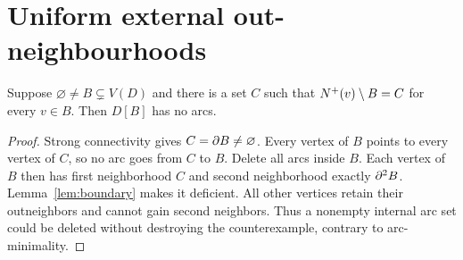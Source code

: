 \section{Uniform external out-neighbourhoods}
\begin{lemma}\label{lem:uniform}
Suppose $\varnothing\ne B\subsetneq V(D)$ and there is a set $C$ such
that $N^+(v)\setminus B=C$ for every $v\in B$.
Then $D[B]$ has no arcs.
\end{lemma}
\begin{proof}
Strong connectivity gives $C=\partial B\ne\varnothing$.
Every vertex of $B$ points to every vertex of $C$, so no arc goes from
$C$ to $B$. Delete all arcs inside $B$. Each vertex of $B$ then has
first neighborhood $C$ and second neighborhood exactly $\partial^2B$.
Lemma~\ref{lem:boundary} makes it deficient. All other vertices retain
their outneighbors and cannot gain second neighbors. Thus a nonempty
internal arc set could be deleted without destroying the counterexample,
contrary to arc-minimality.
\end{proof}
